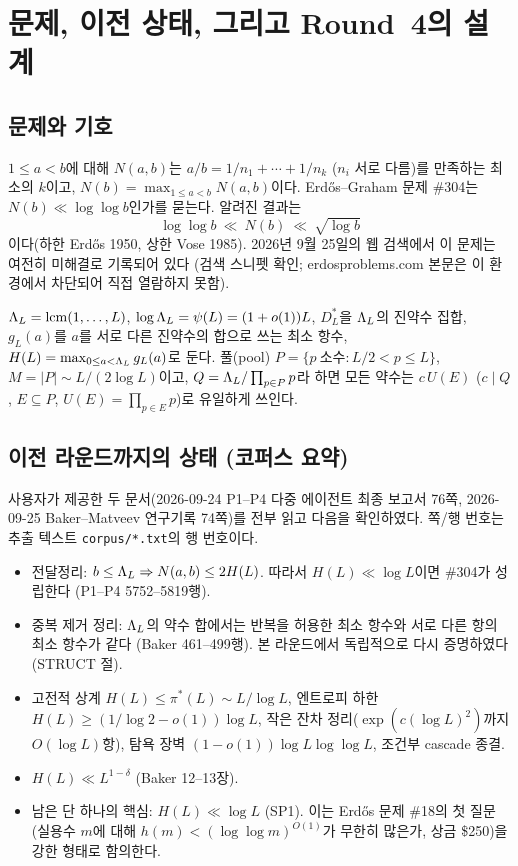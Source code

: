 \section{문제, 이전 상태, 그리고 Round~4의 설계}\label{LEAD:framework}

\subsection{문제와 기호}
$1\le a<b$에 대해 $N(a,b)$는 $a/b=1/n_1+\cdots+1/n_k$ ($n_i$ 서로 다름)를 만족하는 최소의 $k$이고, $N(b)=\max_{1\le a<b}N(a,b)$이다. Erdős–Graham 문제 \#304는 $N(b)\ll\log\log b$인가를 묻는다. 알려진 결과는
\[
\log\log b\ \ll\ N(b)\ \ll\ \sqrt{\log b}
\]
이다(하한 Erdős 1950, 상한 Vose 1985). 2026년 9월 25일의 웹 검색에서 이 문제는 여전히 미해결로 기록되어 있다 \EXT{}(검색 스니펫 확인; erdosproblems.com 본문은 이 환경에서 차단되어 직접 열람하지 못함).

$\Lambda_L=\operatorname{lcm}(1,\dots,L)$, $\log\Lambda_L=\psi(L)=(1+o(1))L$, $D^*_L$을 $\Lambda_L$의 진약수 집합, $g_L(a)$를 $a$를 서로 다른 진약수의 합으로 쓰는 최소 항수, $H(L)=\max_{0\le a<\Lambda_L}g_L(a)$로 둔다. 풀(pool) $P=\{p\ \text{소수}: L/2<p\le L\}$, $M=|P|\sim L/(2\log L)$이고, $Q=\Lambda_L/\prod_{p\in P}p$라 하면 모든 약수는 $c\,U(E)$ ($c\mid Q$, $E\subseteq P$, $U(E)=\prod_{p\in E}p$)로 유일하게 쓰인다.

\subsection{이전 라운드까지의 상태 (코퍼스 요약)}
사용자가 제공한 두 문서(2026-09-24 P1--P4 다중 에이전트 최종 보고서 76쪽, 2026-09-25 Baker--Matveev 연구기록 74쪽)를 전부 읽고 다음을 확인하였다. 쪽/행 번호는 추출 텍스트 \texttt{corpus/*.txt}의 행 번호이다.
\begin{itemize}[leftmargin=1.5em]
\item \PROVED{} 전달정리: $b\le\Lambda_L\Rightarrow N(a,b)\le 2H(L)$. 따라서 $H(L)\ll\log L$이면 \#304가 성립한다 (P1--P4 5752--5819행).
\item \PROVED{} 중복 제거 정리: $\Lambda_L$의 약수 합에서는 반복을 허용한 최소 항수와 서로 다른 항의 최소 항수가 같다 (Baker 461--499행). 본 라운드에서 독립적으로 다시 증명하였다(STRUCT 절).
\item \PROVED{} 고전적 상계 $H(L)\le\pi^*(L)\sim L/\log L$, 엔트로피 하한 $H(L)\ge(1/\log2-o(1))\log L$, 작은 잔차 정리($\exp(c(\log L)^2)$까지 $O(\log L)$항), 탐욕 장벽 $(1-o(1))\log L\log\log L$, 조건부 cascade 종결.
\item {} $H(L)\ll L^{1-\delta}$ (Baker 12--13장).
\item \OPEN{} 남은 단 하나의 핵심: $H(L)\ll\log L$ (SP1). 이는 Erdős 문제 \#18의 첫 질문(실용수 $m$에 대해 $h(m)<(\log\log m)^{O(1)}$가 무한히 많은가, 상금 \$250)을 강한 형태로 함의한다.
\end{itemize}

